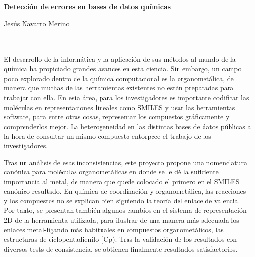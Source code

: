 \chapter*{}



\thispagestyle{empty}

\begin{center}
{\large\bfseries Detección de errores en bases de datos químicas}\\
\end{center}
\begin{center}
Jesús Navarro Merino\\
\end{center}

\\

\vspace{0.7cm}
\\

El desarrollo de la informática y la aplicación de sus métodos al mundo de la química ha propiciado grandes avances en esta ciencia. Sin embargo, un campo poco explorado dentro de la química computacional es la organometálica, de manera que muchas de las herramientas existentes no están preparadas para trabajar con ella. En esta área, para los investigadores es importante codificar las moléculas en representaciones lineales como SMILES y usar las herramientas software, para entre otras cosas, representar los compuestos gráficamente y comprenderlos mejor. La heterogeneidad en las distintas bases de datos públicas a la hora de consultar un mismo compuesto entorpece el trabajo de los investigadores.

Tras un análisis de esas inconsistencias, este proyecto propone una nomenclatura canónica para moléculas organometálicas en donde se le dé la suficiente importancia al metal, de manera que quede colocado el primero en el SMILES canónico resultado. En química de coordinación y organometálica, las reacciones y los compuestos no se explican bien siguiendo la teoría del enlace de valencia. Por tanto, se presentan también algunos cambios en el sistema de representación 2D de la herramienta utilizada, para ilustrar de una manera más adecuada los enlaces metal-ligando más habituales en compuestos organometálicos, las estructuras de ciclopentadienilo (Cp). Tras la validación de los resultados con diversos tests de consistencia, se obtienen finalmente resultados satisfactorios.

